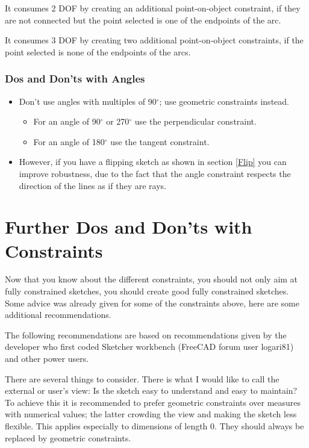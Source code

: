 \documentclass[12pt,titlepage]{article}
\newcommand{\degree}{\ensuremath{^\circ}}
\begin{document}
\begin {itemize}
\begin{description}
It consumes 2 DOF by creating an additional point-on-object constraint, if
they are not connected but the point selected is one of the endpoints of the
arc.

It consumes 3 DOF by creating two additional point-on-object constraints, if
the point selected is none of the endpoints of the arcs.

\end{description}

\subsubsection*{Dos and Don'ts with Angles}
\begin{itemize}
\item Don't use angles with multiples of 90\degree; use geometric constraints
      instead.
      \begin{itemize}
      \item For an angle of 90\degree{} or 270\degree{} use the perpendicular constraint.
      \item For an angle of 180\degree{} use the tangent constraint.
      \end{itemize}
\item However, if you have a flipping sketch as shown in section \vref{Flip}
      you can improve robustness, due to the fact that the angle constraint
      respects the direction of the lines as if they are rays.
\end{itemize}

\section{Further Dos and Don'ts with Constraints}
\label{SolverRecommendations}
Now that you know about the different constraints, you should not only aim at
fully constrained sketches, you should create good fully constrained sketches. Some advice
was already given for some of the constraints above, here are some additional recommendations.

The following recommendations are based on recommendations given by the developer who first
coded Sketcher workbench (FreeCAD forum user logari81) and other power users.

There are several things to consider. There is what I would like to call the
external or user's view: Is the sketch easy to understand and easy to maintain? To achieve this it
is recommended to prefer geometric constraints over measures with numerical
values; the latter crowding the view and making the sketch less flexible. This applies
especially to dimensions of length 0. They should always be replaced by geometric constraints.


\end{itemize}
\end{document}
